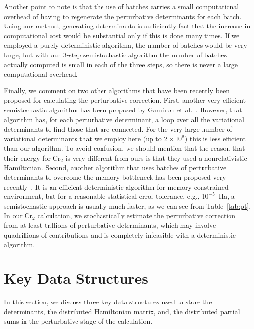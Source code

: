 \documentclass[%
reprint,
 superscriptaddress,
 amsmath,amssymb,
 aps,
]{revtex4-1}
\begin{document}
Another point to note is that the use of batches carries a small computational overhead of having to regenerate the
perturbative determinants for each batch.  Using our method, generating determinants is sufficiently fast that the
increase in computational cost would be substantial only if this is done many times.  If we employed a purely
deterministic algorithm, the number of batches would be very large, but with our 3-step semistochastic algorithm
the number of batches actually computed is small in each of the three steps, so there is never a large computational overhead.

Finally, we comment on two other algorithms that have been recently been proposed for calculating the perturbative correction.
First, another very efficient semistochastic algorithm has been proposed
by Garniron et al.~\cite{GarSceLooCaf-JCP-17}.  However, that algorithm has, for each perturbative determinant, a loop over all
the variational determinants to find those that are connected.  For the very large number of variational determinants that we employ
here (up to $2 \times 10^9$) this is less efficient than our algorithm.
To avoid confusion, we should mention that the reason that their energy for Cr$_2$ is very different from ours is
that they used a nonrelativistic Hamiltonian.
Second, another algorithm that uses batches of perturbative determinants to overcome the memory bottleneck has been proposed
very recently~\cite{TubLevHaiHeaWha-ARX-18}.
It is an efficient deterministic algorithm for memory constrained environment, but for a reasonable statistical error tolerance, e.g., $10^{-5}$~Ha, a semistochastic approach is usually much faster, as we can see from Table~\ref{tab:pt}.
In our Cr$_2$ calculation, we stochastically estimate the perturbative correction from at least trillions of perturbative determinants, which may involve quadrillions of contributions and is completely infeasible with a deterministic algorithm.


\section{Key Data Structures}
\label{key}
In this section, we discuss three key data structures used to store the determinants, the distributed Hamiltonian matrix, and,
the distributed partial sums in the perturbative stage of the calculation.
\end{document}
